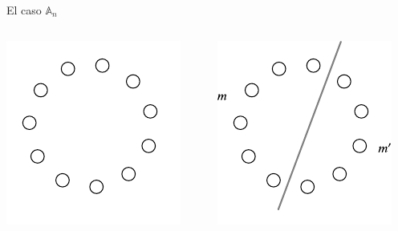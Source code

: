 \documentclass[spanish]{beamer}
\begin{document}
\begin{frame}{El caso $\mathbb{A}_n$}
  \begin{columns}
    \begin{column}{5cm}
      \includegraphics[height=1\textwidth]{Figuras/A-bloque1} 
    \end{column}
    \begin{column}{5cm}
      \includegraphics[height=1\textwidth]{Figuras/A-bloque2}      
    \end{column}
  \end{columns}
\end{frame}
\end{document}
